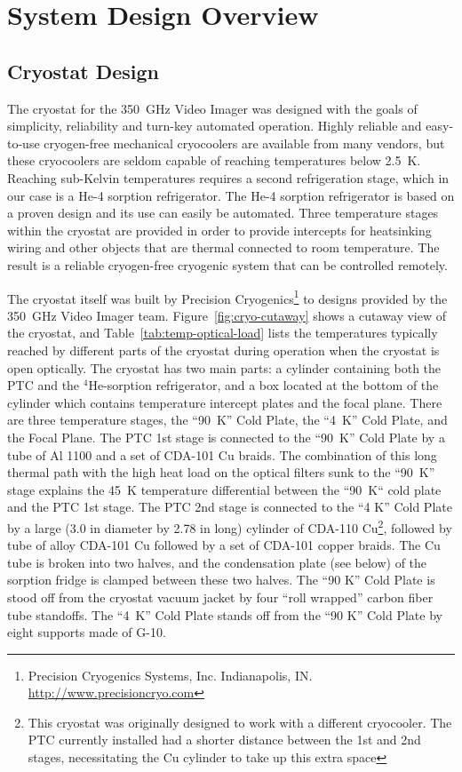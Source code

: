 \documentclass[10pt,twocolumn,article]{memoir}
\newcommand*{\figref}[1]{Figure~\ref{#1}}
\newcommand*{\tableref}[1]{Table~\ref{#1}}
\newcommand*{\He}[1]{$^{#1}$He\xspace}
\newcommand*{\Imager}{350~GHz Video Imager\xspace}
\begin{document}
\chapter{System Design Overview}\label{c:sys-design}

\section{Cryostat Design}\label{s-cryo-design}

The cryostat for the \Imager was designed with the goals of simplicity, reliability and turn-key automated operation.
Highly reliable and easy-to-use cryogen-free mechanical cryocoolers are available from many vendors, but these cryocoolers are seldom capable of reaching temperatures below 2.5~K.
Reaching sub-Kelvin temperatures requires a second refrigeration stage, which in our case is a He-4 sorption refrigerator.
The He-4 sorption refrigerator is based on a proven design and its use can easily be automated.
Three temperature stages within the cryostat are provided in order to provide intercepts for heatsinking wiring and other objects that are thermal connected to room temperature. 
The result is a reliable cryogen-free cryogenic system that can be controlled remotely.

The cryostat itself was built by Precision Cryogenics\footnote{Precision Cryogenics Systems, Inc. Indianapolis, IN. \url{http://www.precisioncryo.com}} to designs provided by the \Imager team.
\figref{fig:cryo-cutaway} shows a cutaway view of the cryostat, and \tableref{tab:temp-optical-load} lists the temperatures typically reached by different parts of the cryostat during operation when the cryostat is open optically.
The cryostat has two main parts: a cylinder containing both the PTC and the \He4-sorption refrigerator, and a box located at the bottom of the cylinder which contains temperature intercept plates and the focal plane.
There are three temperature stages, the ``90~K'' Cold Plate, the ``4~K'' Cold Plate, and the Focal Plane.
The PTC 1st stage is connected to the ``90~K'' Cold Plate by a tube of Al 1100 and a set of CDA-101 Cu braids.
The combination of this long thermal path with the high heat load on the optical filters sunk to the ``90~K'' stage explains the 45~K temperature differential between the ``90~K`` cold plate and the PTC 1st stage.
The PTC 2nd stage is connected to the ``4 K'' Cold Plate by a large (3.0 in diameter by 2.78 in long) cylinder of CDA-110 Cu\footnote{This cryostat was originally designed to work with a different cryocooler. The PTC currently installed had a shorter distance between the 1st and 2nd stages, necessitating the Cu cylinder to take up this extra space}, followed by tube of alloy CDA-101 Cu followed by a set of  CDA-101 copper braids.
The Cu tube is broken into two halves, and the condensation plate (see below) of the sorption fridge is clamped between these two halves. The ``90 K'' Cold Plate is stood off from the cryostat vacuum jacket by four ``roll wrapped'' carbon fiber tube standoffs. The ``4~K'' Cold Plate stands off from the ``90 K'' Cold Plate by eight supports made of G-10.
\end{document}
